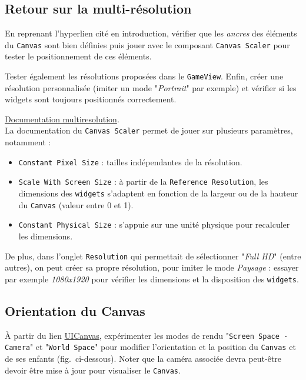\documentclass[a4paper,10pt]{article}
\newenvironment{solution}%
{\begin{tcolorbox}[breakable,colback=red!5!white,colframe=red!75!black,title=Solution]}%
{\end{tcolorbox}}
\begin{document}
\subsection{Retour sur la multi-résolution}
En reprenant l'hyperlien cité en introduction, vérifier que les \textit{ancres} des éléments du \texttt{Canvas} sont bien définies puis jouer avec le composant \texttt{Canvas Scaler} pour tester le positionnement de ces éléments. 

Tester également les résolutions proposées dans le \texttt{GameView}. Enfin, créer une résolution personnalisée (imiter un mode "\textit{Portrait}" par exemple) et vérifier si les widgets sont toujours positionnés correctement.

\ifversionenseignant
\begin{solution}
	\href{ https://docs.unity3d.com/2020.1/Documentation/Manual/HOWTO-UIMultiResolution.html}{Documentation multiresolution}. \\
	
La documentation du \texttt{Canvas Scaler} permet de jouer sur plusieurs paramètres, notamment :
\begin{itemize}
	\item \texttt{Constant Pixel Size} : tailles indépendantes de la résolution.
	\item \texttt{Scale With Screen Size} : à partir de la \texttt{Reference Resolution}, les dimensions des \texttt{widgets} s'adaptent en fonction de la largeur ou de la hauteur du \texttt{Canvas} (valeur entre 0 et 1).
	\item \texttt{Constant Physical Size} : s'appuie sur une unité physique pour recalculer les dimensions.
\end{itemize}

De plus, dans l'onglet \texttt{Resolution} qui permettait de sélectionner "\textit{Full HD}" (entre autres), on peut créer sa propre résolution, pour imiter le mode \textit{Paysage} : essayer par exemple \textit{1080x1920} pour vérifier les dimensions et la disposition des \texttt{widgets}.

\end{solution}
\fi 


\subsection{Orientation du Canvas}
À partir du lien \href{https://docs.unity3d.com/2022.3/Documentation/Manual/UICanvas.html}{UICanvas}, expérimenter les modes de rendu "\texttt{Screen Space - Camera}" et "\texttt{World Space}" pour modifier l'orientation et la position du \texttt{Canvas} et de ses enfants (fig.~ci-dessous). Noter que la caméra associée devra peut-être devoir être mise à jour pour visualiser le \texttt{Canvas}.
\end{document}
